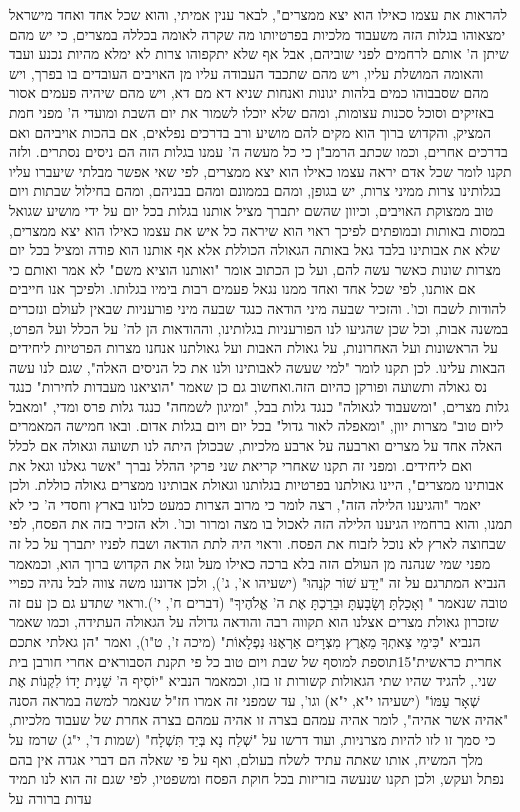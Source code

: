 \documentclass[12pt, openany]{book}
\begin{document}
להראות את עצמו כאילו הוא יצא ממצרים", לבאר ענין אמיתי, והוא שכל אחד ואחד מישראל ימצאוהו בגלות הזה משעבוד מלכיות בפרטיותו מה שקרה לאומה בכללה במצרים, כי יש מהם שיתן ה' אותם לרחמים לפני שוביהם, אבל אף שלא יתקפוהו צרות לא ימלא מהיות נכנע ועבד והאומה המושלת עליו, ויש מהם שתכבד העבודה עליו מן האויבים העובדים בו בפרך, ויש מהם שסבבוהו כמים בלהות יגונות ואנחות שניא דא מם דא, ויש מהם שיהיה פעמים אסור באזיקים וסוכל סכנות עצומות, ומהם שלא יוכלו לשמור את יום השבת ומועדי ה' מפני חמת המציק, והקדוש ברוך הוא מקים להם מושיע ורב בדרכים נפלאים, אם בהכות אויביהם ואם בדרכים אחרים, וכמו שכתב הרמב"ן כי כל מעשה ה' עמנו בגלות הזה הם ניסים נסתרים. ולזה תקנו לומר שכל אדם יראה עצמו כאילו הוא יצא ממצרים, לפי שאי אפשר מבלתי שיעברו עליו בגלותינו צרות ממיני צרות, יש בגופן, ומהם בממונם ומהם בבניהם, ומהם בחילול שבתות ויום טוב ממצוקת האויבים, וכיוון שהשם יתברך מציל אותנו בגלות בכל יום על ידי מושיע שגואל במסות באותות ובמופתים לפיכך ראוי הוא שיראה כל איש את עצמו כאילו הוא יצא ממצרים, שלא את אבותינו בלבד גאל באותה הגאולה הכוללת אלא אף אותנו הוא פודה ומציל בכל יום מצרות שונות כאשר עשה להם, ועל כן הכתוב אומר "ואותנו הוציא משם" לא אמר ואותם כי אם אותנו, לפי שכל אחד ואחד ממנו נגאל פעמים רבות בימיו בגלותו. ולפיכך אנו חייבים להודות לשבח וכו'. והזכיר שבעה מיני הודאה כנגד שבעה מיני פורעניות שבאין לעולם ונזכרים במשנה אבות, וכל שכן שהגיעו לנו הפורעניות בגלותינו, וההודאות הן לה' על הכלל ועל הפרט, על הראשונות ועל האחרונות, על גאולת האבות ועל גאולתנו אנחנו מצרות הפרטיות ליחידים הבאות עלינו. לכן תקנו לומר "למי שעשה לאבותינו ולנו את כל הניסים האלה", שגם לנו עשה נס גאולה ותשועה ופורקן כהיום הזה.ואחשוב גם כן שאמר "הוציאנו מעבדות לחירות" כנגד גלות מצרים, "ומשעבוד לגאולה" כנגד גלות בבל, "ומיגון לשמחה" כנגד גלות פרס ומדי, "ומאבל ליום טוב" מצרות יוון, "ומאפלה לאור גדול" בכל יום ויום בגלות אדום. ובאו חמישה המאמרים האלה אחד על מצרים וארבעה על ארבע מלכיות, שבכולן היתה לנו תשועה וגאולה אם לכלל ואם ליחידים. ומפני זה תקנו שאחרי קריאת שני פרקי ההלל נברך "אשר גאלנו וגאל את אבותינו ממצרים", היינו גאולתנו בפרטיות בגלותנו וגאולת אבותינו ממצרים גאולה כוללת. ולכן יאמר "והגיענו הלילה הזה", רצה לומר כי מרוב הצרות כמעט כלונו בארץ וחסדי ה' כי לא תמנו, והוא ברחמיו הגיענו הלילה הזה לאכול בו מצה ומרור וכו'. ולא הזכיר בזה את הפסח, לפי שבחוצה לארץ לא נוכל לזבוח את הפסח. וראוי היה לתת הודאה ושבח לפניו יתברך על כל זה מפני שמי שנהנה מן העולם הזה בלא ברכה כאילו מעל וגזל את הקדוש ברוך הוא, וכמאמר הנביא המתרגם על זה "יָדַע שׁוֹר קֹנֵהוּ" (ישעיהו א', ג'), ולכן אדוננו משה צווה לבל נהיה כפויי טובה שנאמר " וְאָכַלְתָּ וְשָׂבָעְתָּ וּבֵרַכְתָּ אֶת ה' אֱלֹהֶיךָ" (דברים ח', י').וראוי שתדע גם כן עם זה שזכרון גאולת מצרים אצלנו הוא תקווה רבה והודאה גדולה על הגאולה העתידה, וכמו שאמר הנביא "כִּימֵי צֵאתְךָ מֵאֶרֶץ מִצְרָיִם אַרְאֶנּוּ נִפְלָאוֹת" (מיכה ז', ט"ו), ואמר "הן גאלתי אתכם אחרית כראשית"15תוספת למוסף של שבת ויום טוב כל פי תקנת הסבוראים אחרי חורבן בית שני., להגיד שהיו שתי הגאולות קשורות זו בזו, וכמאמר הנביא "יוֹסִיף ה' שֵׁנִית יָדוֹ לִקְנוֹת אֶת שְׁאָר עַמּוֹ" (ישעיהו י"א, י"א) וגו', עד שמפני זה אמרו חז"ל שנאמר למשה במראה הסנה "אהיה אשר אהיה", לומר אהיה עמהם בצרה זו אהיה עמהם בצרה אחרת של שעבוד מלכיות, כי סמך זו לזו להיות מצרניות, ועוד דרשו על "שְׁלַח נָא בְּיַד תִּשְׁלָח" (שמות ד', י"ג) שרמז על מלך המשיח, אותו שאתה עתיד לשלח בעולם, ואף על פי שאלה הם דברי אגדה אין בהם נפתל ועקש, ולכן תקנו שנעשה בזריזות בכל חוקת הפסח ומשפטיו, לפי שגם זה הוא לנו תמיד עדות ברורה על 
\end{document}
